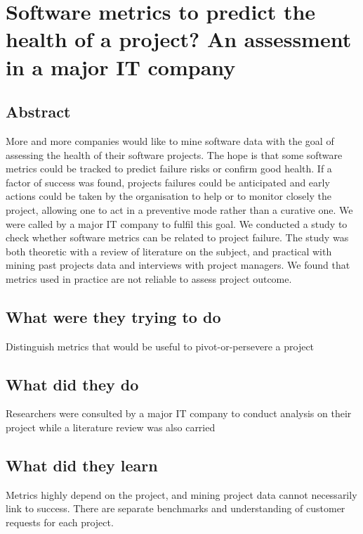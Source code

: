 \section{Software metrics to predict the health of a project? An assessment in a major IT company}

\subsection{Abstract}

More and more companies would like to mine software data with the goal of assessing the health of their software projects. The hope is that some software metrics could be tracked to predict failure risks or confirm good health. If a factor of success was found, projects failures could be anticipated and early actions could be taken by the organisation to help or to monitor closely the project, allowing one to act in a preventive mode rather than a curative one. We were called by a major IT company to fulfil this goal. We conducted a study to check whether software metrics can be related to project failure. The study was both theoretic with a review of literature on the subject, and practical with mining past projects data and interviews with project managers. We found that metrics used in practice are not reliable to assess project outcome.

\subsection{What were they trying to do}

Distinguish metrics that would be useful to pivot-or-persevere a project

\subsection{What did they do}

Researchers were consulted by a major IT company to conduct analysis on their project while a literature review was also carried

\subsection{What did they learn}

Metrics highly depend on the project, and mining project data cannot necessarily link to success. There are separate benchmarks and understanding of customer requests for each project.
